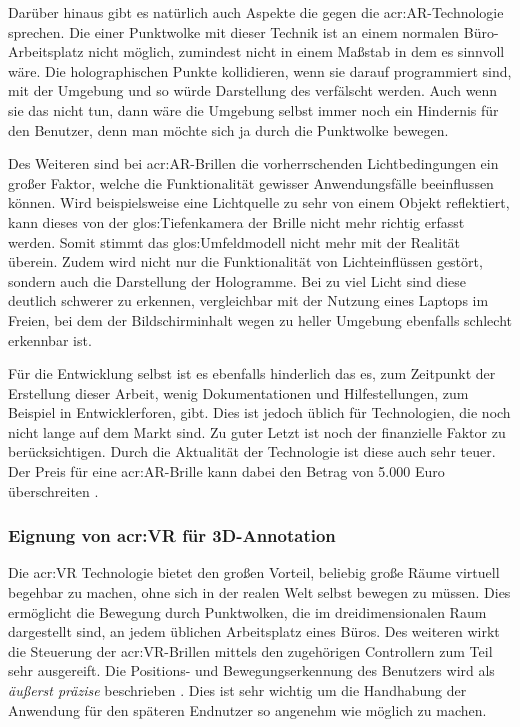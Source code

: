 Darüber hinaus gibt es natürlich auch Aspekte die gegen die \acrshort{acr:AR}-Technologie sprechen. Die  einer Punktwolke mit dieser Technik ist an einem normalen Büro-Arbeitsplatz nicht möglich, zumindest nicht in einem Maßstab in dem es sinnvoll wäre. Die holographischen Punkte kollidieren, wenn sie darauf programmiert sind, mit der Umgebung und so würde Darstellung des  verfälscht werden. Auch wenn sie das nicht tun, dann wäre die Umgebung selbst immer noch ein Hindernis für den Benutzer, denn man möchte sich ja durch die Punktwolke bewegen. 

Des Weiteren sind bei \acrshort{acr:AR}-Brillen die vorherrschenden Lichtbedingungen ein großer Faktor, welche die Funktionalität gewisser Anwendungsfälle beeinflussen können. Wird beispielsweise eine Lichtquelle zu sehr von einem Objekt reflektiert, kann dieses von der \gls{glos:Tiefenkamera} der Brille nicht mehr richtig erfasst werden. Somit stimmt das \gls{glos:Umfeldmodell} nicht mehr mit der Realität überein. Zudem wird nicht nur die Funktionalität von Lichteinflüssen gestört, sondern auch die Darstellung der Hologramme. Bei zu viel Licht sind diese deutlich schwerer zu erkennen, vergleichbar mit der Nutzung eines Laptops im Freien, bei dem der Bildschirminhalt wegen zu heller Umgebung ebenfalls schlecht erkennbar ist. 

Für die Entwicklung selbst ist es ebenfalls hinderlich das es, zum Zeitpunkt der Erstellung dieser Arbeit, wenig Dokumentationen und Hilfestellungen, zum Beispiel in Entwicklerforen, gibt. Dies ist jedoch üblich für Technologien, die noch nicht lange auf dem Markt sind. Zu guter Letzt ist noch der finanzielle Faktor zu berücksichtigen. Durch die Aktualität der Technologie ist diese auch sehr teuer. Der Preis für eine \acrshort{acr:AR}-Brille kann dabei den Betrag von 5.000 Euro überschreiten \cite{bib:HololensPreis}.   

\subsubsection{Eignung von \acrlong{acr:VR} für 3D-Annotation} 

Die \acrlong{acr:VR} Technologie bietet den großen Vorteil, beliebig große Räume virtuell begehbar zu machen, ohne sich in der realen Welt selbst bewegen zu müssen. Dies ermöglicht die Bewegung durch Punktwolken, die im dreidimensionalen Raum dargestellt sind, an jedem üblichen Arbeitsplatz eines Büros. Des weiteren wirkt die Steuerung der \acrshort{acr:VR}-Brillen mittels den zugehörigen Controllern zum Teil sehr ausgereift. Die Positions- und Bewegungserkennung des Benutzers wird als \textit{\glqq äußerst präzise\grqq} beschrieben \cite{bib:ControllerTest}. Dies ist sehr wichtig um die Handhabung der Anwendung für den späteren Endnutzer so angenehm wie möglich zu machen.

